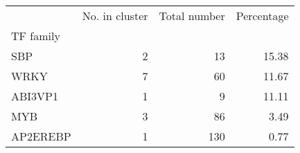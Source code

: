 \begin{tabular}{lrrr}
\toprule
{} &  No. in cluster &  Total number &  Percentage \\
TF family &                 &               &             \\
\midrule
SBP       &               2 &            13 &       15.38 \\
WRKY      &               7 &            60 &       11.67 \\
ABI3VP1   &               1 &             9 &       11.11 \\
MYB       &               3 &            86 &        3.49 \\
AP2EREBP  &               1 &           130 &        0.77 \\
\bottomrule
\end{tabular}
